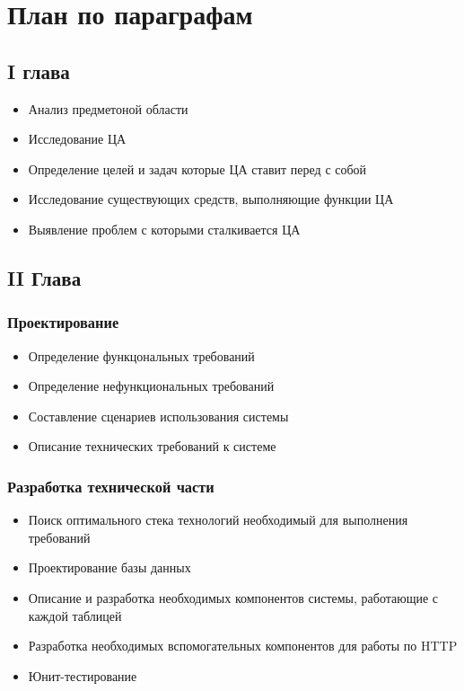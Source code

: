 \documentclass[14pt, timesnewroman]{article}
\begin{document}
\section{План по параграфам}

\subsection{I глава}
\begin{itemize}
    \item Анализ предметоной области
    \item Исследование ЦА
    \item Определение целей и задач которые ЦА ставит перед с собой
    \item Исследование существующих средств, выполняющие функции ЦА
    \item Выявление проблем с которыми сталкивается ЦА
\end{itemize}
\subsection{II Глава}
\subsubsection{Проектирование}
\begin{itemize}
    \item Определение функцональных требований
    \item Определение нефункциональных требований
    \item Составление сценариев использования системы
    \item Описание технических требований к системе
\end{itemize}
\subsubsection{Разработка технической части}
\begin{itemize}
    \item Поиск оптимального стека технологий необходимый для выполнения требований
    \item Проектирование базы данных
    \item Описание и разработка необходимых компонентов системы, работающие с каждой таблицей
    \item Разработка необходимых вспомогательных компонентов для работы по HTTP
    \item Юнит-тестирование
\end{itemize}
\end{document}
